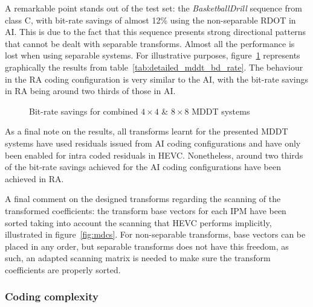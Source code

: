 \documentclass[11pt,a4paper,openright,twoside]{book}
\numberwithin{equation}{section} %
\numberwithin{figure}{section} %
\numberwithin{table}{section} %
\begin{document}
A remarkable point stands out of the test set: the \emph{BasketballDrill}
sequence from class C, with bit-rate savings of almost 12\% using the
non-separable \ac{RDOT} in \ac{AI}.
This is due to the fact that this sequence presents strong directional
patterns that cannot be dealt with separable transforms.
Almost all the performance is lost when using separable systems.
For illustrative purposes, figure~\ref{fig:detailed_mddt_bd_rate} represents
graphically the results from table~\ref{tab:detailed_mddt_bd_rate}.
The behaviour in the \ac{RA} coding configuration is very similar to the
\ac{AI}, with the bit-rate savings in \ac{RA} being around two thirds of those
in \ac{AI}.

\begin{figure}[tp]
	\centering


	\caption{Bit-rate savings for combined $4\times4$ \& $8\times8$ \acs{MDDT}
	systems}
	\label{fig:detailed_mddt_bd_rate}
\end{figure}

As a final note on the results, all transforms learnt for the presented
\ac{MDDT} systems have used residuals issued from \ac{AI} coding
configurations and have only been enabled for intra coded residuals in
\ac{HEVC}.
Nonetheless, around two thirds of the bit-rate savings achieved for the
\ac{AI} coding configurations have been achieved in \ac{RA}.

A final comment on the designed transforms regarding the scanning of the
transformed coefficients:
the transform base vectors for each \ac{IPM} have been sorted taking into
account the scanning that \ac{HEVC} performs implicitly, illustrated in
figure~\ref{fig:mdcs}.
For non-separable transforms, base vectors can be placed in any order, but
separable transforms does not have this freedom, as such, an adapted scanning
matrix is needed to make sure the transform coefficients are properly sorted.

\subsubsection{Coding complexity}
\label{ssub:mddt_coding_complexity}
\end{document}
